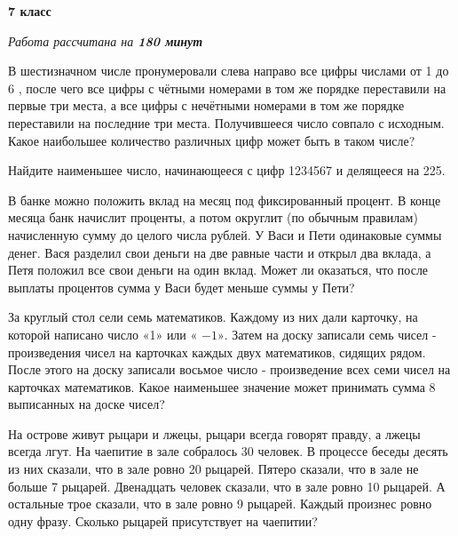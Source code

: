 \centerline{\bf \huge 7 класс}
\centerline{\normalsize{\it Работа рассчитана на \bf{180} минут}}

В шестизначном числе пронумеровали слева направо все цифры числами от 1 до 6 , после чего все цифры с чётными номерами в том же порядке переставили на первые три места, а все цифры с нечётными номерами в том же порядке переставили на последние три места. Получившееся число совпало с исходным. Какое наибольшее количество различных цифр может быть в таком числе?

Найдите наименьшее число, начинающееся с цифр 1234567 и делящееся на 225.

В банке можно положить вклад на месяц под фиксированный процент. В конце месяца банк начислит проценты, а потом округлит (по обычным правилам) начисленную сумму до целого числа рублей. У Васи и Пети одинаковые суммы денег. Вася разделил свои деньги на две равные части и открыл два вклада, а Петя положил все свои деньги на один вклад. Может ли оказаться, что после выплаты процентов сумма у Васи будет меньше суммы у Пети?

За круглый стол сели семь математиков. Каждому из них дали карточку, на которой написано число «1» или « $-1 »$. Затем на доску записали семь чисел - произведения чисел на карточках каждых двух математиков, сидящих рядом. После этого на доску записали восьмое число - произведение всех семи чисел на карточках математиков. Какое наименьшее значение может принимать сумма 8 выписанных на доске чисел?

На острове живут рыцари и лжецы, рыцари всегда говорят правду, а лжецы всегда лгут. На чаепитие в зале собралось 30 человек. В процессе беседы десять из них сказали, что в зале ровно 20 рыцарей. Пятеро сказали, что в зале не больше 7 рыцарей. Двенадцать человек сказали, что в зале ровно 10 рыцарей. А остальные трое сказали, что в зале ровно 9 рыцарей. Каждый произнес ровно одну фразу. Сколько рыцарей присутствует на чаепитии?